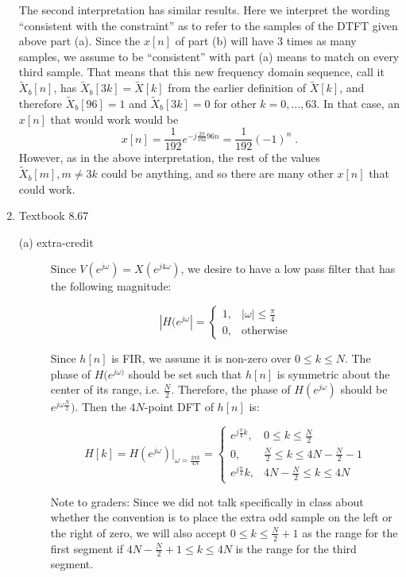 \documentclass[11pt]{article}
\begin{document}
\begin{enumerate}
\vspace{4mm} The second interpretation has similar results. Here we interpret the wording ``consistent with the constraint'' as to refer to the samples of the DTFT given above part (a). Since the $x[n]$ of part (b) will have 3 times as many samples, we assume to be ``consistent'' with part (a) means to match on every third sample. That means that this new frequency domain sequence, call it $
\widetilde{X}_b[n]$, has $\widetilde{X}_b[3k] = \widetilde{X}[k]$ from the earlier definition of $\widetilde{X}[k]$, and therefore $\widetilde{X}_b[96]=1$ and $\widetilde{X}_b[3k]=0$ for other $k = 0, \dots, 63$. In that case, an $x[n]$ that would work would be $$x[n] = \frac{1}{192} e^{-j\frac{2\pi}{192} 96 n} = \frac{1}{192}(-1)^n\;.$$ However, as in the above interpretation, the rest of the values $\widetilde{X}_b[m], m \neq 3k$ could be anything, and so there are many other $x[n]$ that could work.

\vspace{5mm} 
\item Textbook 8.67 %

\begin{description}
\item[(a) extra-credit] Since $V(e^{j\omega}) = X(e^{j 4 \omega})$, we desire to have a low pass filter that has the following magnitude:

\[ |H(e^{j\omega}| = \begin{cases}1, &|\omega| \leq \frac{\pi}{4} \\ 0, & \text{otherwise} \end{cases} \]

Since $h[n]$ is FIR, we assume it is non-zero over $0 \leq k \leq N$. The phase of $H(e^{j \omega)}$ should be set such that $h[n]$ is symmetric about the center of its range, i.e. $\frac{N}{2}$. Therefore, the phase of $H(e^{j\omega})$ should be $e^{j \omega \frac{N}{2}})$. Then the $4N$-point DFT of $h[n]$ is:

\[ H[k] = H(e^{j \omega})\big|_{\omega = \frac{2 \pi k}{4N}} = \begin{cases} e^{j \frac{\pi}{4}k}, & 0 \leq k \leq \frac{N}{2} \\ 0, & \frac{N}{2} \leq k \leq 4N-\frac{N}{2} - 1 \\ e^{j \frac{\pi}{4}} k, & 4N -\frac{N}{2} \leq k \leq 4N \end{cases}\]

Note to graders: Since we did not talk specifically in class about whether the convention is to place the extra odd sample on the left or the right of zero, we will also accept $0\leq k \leq \frac{N}{2}+1$ as the range for the first segment if $4N-\frac{N}{2}+1 \leq k \leq 4N$ is the range for the third segment.


\end{description}
\end{enumerate}
\end{document}
